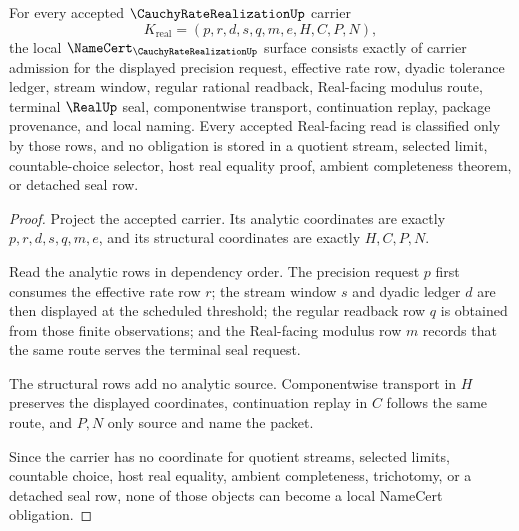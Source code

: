 \begin{theorem}
\label{thm:cauchy-rate-realization-namecert-obligations}
For every accepted $\CauchyRateRealizationUp$ carrier
$$
K_{\mathrm{real}}=(p,r,d,s,q,m,e,H,C,P,N),
$$
the local $\NameCert_{\CauchyRateRealizationUp}$ surface consists exactly of carrier admission for the displayed precision request, effective rate row, dyadic tolerance ledger, stream window, regular rational readback, Real-facing modulus route, terminal $\RealUp$ seal, componentwise transport, continuation replay, package provenance, and local naming. Every accepted Real-facing read is classified only by those rows, and no obligation is stored in a quotient stream, selected limit, countable-choice selector, host real equality proof, ambient completeness theorem, or detached seal row.
\end{theorem}
\begin{proof}
Project the accepted carrier. Its analytic coordinates are exactly $p,r,d,s,q,m,e$, and its structural coordinates are exactly $H,C,P,N$.

Read the analytic rows in dependency order. The precision request $p$ first consumes the effective rate row $r$; the stream window $s$ and dyadic ledger $d$ are then displayed at the scheduled threshold; the regular readback row $q$ is obtained from those finite observations; and the Real-facing modulus row $m$ records that the same route serves the terminal seal request.

The structural rows add no analytic source. Componentwise transport in $H$ preserves the displayed coordinates, continuation replay in $C$ follows the same route, and $P,N$ only source and name the packet.

Since the carrier has no coordinate for quotient streams, selected limits, countable choice, host real equality, ambient completeness, trichotomy, or a detached seal row, none of those objects can become a local NameCert obligation.
\end{proof}

